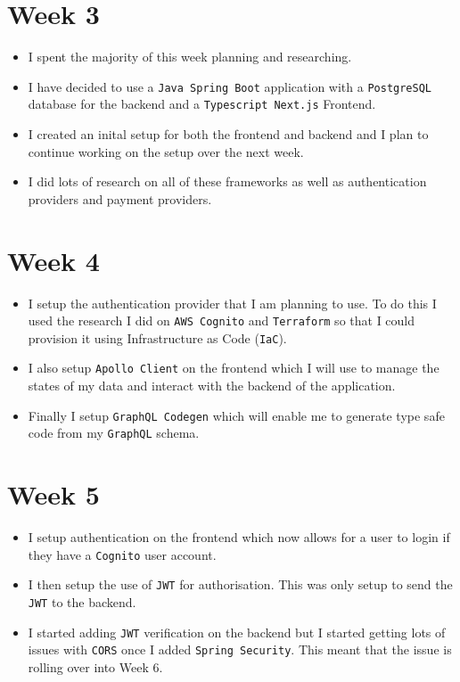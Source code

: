 \documentclass[]{project_report}
\begin{document}
\section{Week 3}
\begin{itemize}
    \item I spent the majority of this week planning and researching.
    \item I have decided to use a \texttt{Java Spring Boot} application with a \texttt{PostgreSQL} database for the backend and a \texttt{Typescript Next.js} Frontend.
    \item I created an inital setup for both the frontend and backend and I plan to continue working on the setup over the next week.
    \item I did lots of research on all of these frameworks as well as authentication providers and payment providers.
\end{itemize}

\section{Week 4}
\begin{itemize}
    \item I setup the authentication provider that I am planning to use. To do this I used the research I did on \texttt{AWS Cognito} and \texttt{Terraform} so that I could provision it using Infrastructure as Code (\texttt{IaC}).
    \item I also setup \texttt{Apollo Client} on the frontend which I will use to manage the states of my data and interact with the backend of the application.
    \item Finally I setup \texttt{GraphQL Codegen} which will enable me to generate type safe code from my \texttt{GraphQL} schema.
\end{itemize}

\section{Week 5}
\begin{itemize}
    \item I setup authentication on the frontend which now allows for a user to login if they have a \texttt{Cognito} user account.
    \item I then setup the use of \texttt{JWT} for authorisation. This was only setup to send the \texttt{JWT} to the backend.
    \item I started adding \texttt{JWT} verification on the backend but I started getting lots of issues with \texttt{CORS} once I added \texttt{Spring Security}. This meant that the issue is rolling over into Week 6.
\end{itemize}
\end{document}
